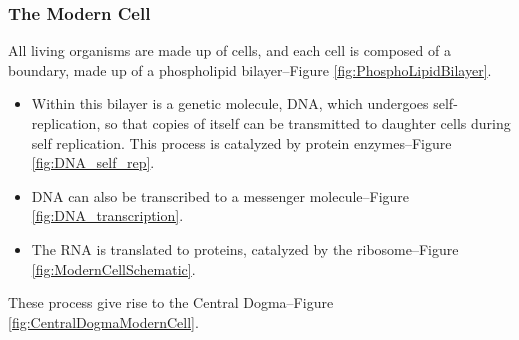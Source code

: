 \documentclass[]{article}
\begin{document}
\subsubsection{The Modern Cell}

All living organisms are made up of cells, and each cell is composed of a boundary, made up of a phospholipid bilayer--Figure \ref{fig:PhosphoLipidBilayer}.\begin{itemize}
	\item  Within this bilayer is a genetic molecule, DNA, which undergoes self-replication, so that copies of itself can be transmitted to daughter cells during self replication. This process is catalyzed by protein enzymes--Figure \ref{fig:DNA_self_rep}.
	\item DNA can also be transcribed to a messenger molecule--Figure  \ref{fig:DNA_transcription}.
	\item The RNA is translated to proteins, catalyzed by the ribosome--Figure \ref{fig:ModernCellSchematic}.
\end{itemize}
These process give rise to the Central Dogma--Figure \ref{fig:CentralDogmaModernCell}.
\end{document}
